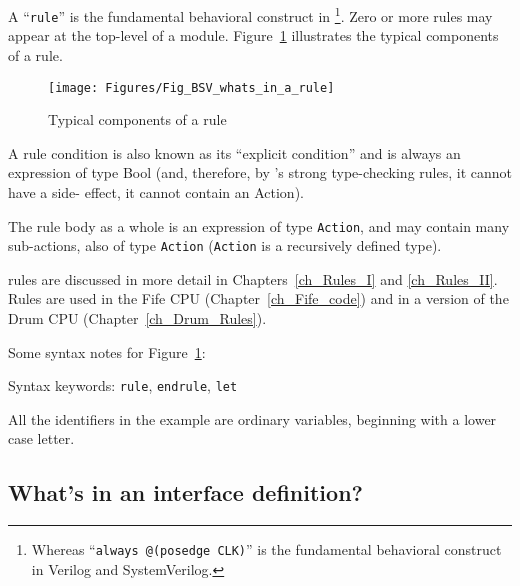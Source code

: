 
A ``\verb|rule|'' is the fundamental behavioral construct in
{\BSV}\footnote{Whereas ``{\tt always @(posedge CLK)}'' is the
fundamental behavioral construct in Verilog and SystemVerilog.}. Zero
or more rules may appear at the top-level of a {\BSV} module.
Figure~\ref{Fig_BSV_whats_in_a_rule} illustrates the typical
components of a rule.

\begin{figure}[htbp]
  \centerline{\texttt{[image: Figures/Fig\_BSV\_whats\_in\_a\_rule]}}
  \caption{\label{Fig_BSV_whats_in_a_rule}
           Typical components of a rule}
\end{figure}

A rule condition is also known as its ``explicit condition'' and is
always an expression of type Bool (and, therefore, by {\BSV}'s strong
type-checking rules, it cannot have a side- effect, {\ie} it cannot
contain an Action).

The rule body as a whole is an expression of type \verb|Action|, and
may contain many sub-actions, also of type \verb|Action|
(\verb|Action| is a recursively defined type).

{\BSV} rules are discussed in more detail in Chapters~\ref{ch_Rules_I}
and \ref{ch_Rules_II}.  Rules are used in the Fife CPU
(Chapter~\ref{ch_Fife_code}) and in a version of the Drum CPU
(Chapter~\ref{ch_Drum_Rules}).

Some syntax notes for Figure~\ref{Fig_BSV_whats_in_a_rule}:

\begin{tightlist}

 \item Syntax keywords: \verb|rule|, \verb|endrule|, \verb|let|

 \item All the identifiers in the example are ordinary variables,
       beginning with a lower case letter.

\end{tightlist}


\subsection{What's in an interface definition?}

\label{Sec_Whats_in_an_interface_definition}


